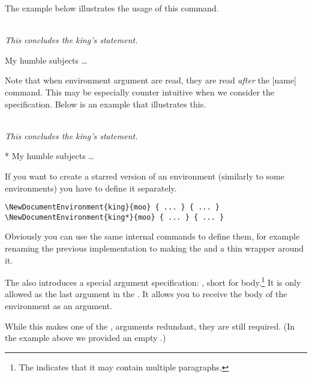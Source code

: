 The example below illustrates the usage of this command.
\begin{example}
 {%
  \\[1em]%
  \emph{This concludes
    the king's statement.}%
}

\begin{king}
My humble subjects \ldots
\end{king}
\end{example}

Note that when environment argument are read, they are read \emph{after} the
[name] command. This may be especially counter intuitive when we
consider the  specification. Below is an example that illustrates
this.

\begin{example}
 {%
  \\[1em]%
  \emph{This concludes
    the king's statement.}%
}

\begin{king}*
My humble subjects \ldots
\end{king}
\end{example}

If you want to create a starred version of an environment (similarly to some
 environments) you have to define it separately.
\begin{verbatim}
\NewDocumentEnvironment{king}{moo} { ... } { ... }
\NewDocumentEnvironment{king*}{moo} { ... } { ... }
\end{verbatim}
Obviously you can use the same internal commands to define them, for example
renaming the previous implementation to  making the
 and  a thin wrapper around it.

The  also introduces a special argument
specification: , short for body.\footnote{The \cargv{+} indicates
  that it may contain multiple paragraphs.} It is only allowed as the last
argument in the . It allows you to receive the body of the
environment as an argument.
While this makes one of the ,  arguments redundant,
they are still required. (In the example above we provided an empty .)

